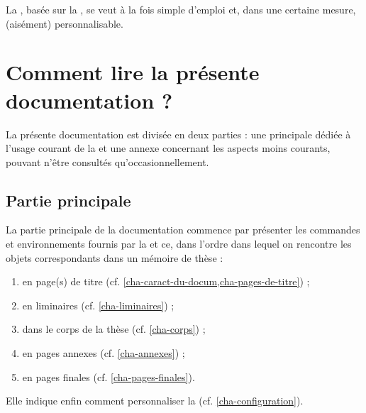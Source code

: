 La \yatCl{}, basée sur la , se veut à la fois simple d'emploi et,
dans une certaine mesure, (aisément) personnalisable.


\section{Comment lire la présente documentation ?}
\label{sec-comment-lire-cette}

La présente documentation est divisée en deux parties : une principale dédiée
à l'usage courant de la \yatCl{} et une annexe concernant les aspects moins
courants, pouvant n'être consultés qu'occasionnellement.

\subsection{Partie principale}
\label{sec-partie-principale}

La partie principale de la documentation commence par présenter les commandes et
environnements fournis par la \yatCl{} et ce, dans l'ordre dans lequel on
rencontre les objets correspondants dans un mémoire de thèse :
\begin{enumerate}
\item en page(s) de titre (cf. \vref{cha-caract-du-docum,cha-pages-de-titre}) ;
\item en \glspl{liminaire} (cf. \vref{cha-liminaires}) ;
\item dans le corps de la thèse (cf. \vref{cha-corps}) ;
\item en pages annexes (cf. \vref{cha-annexes}) ;
\item en pages finales (cf. \vref{cha-pages-finales}).
\end{enumerate}
Elle indique enfin comment personnaliser la \yatCl{}
(cf. \vref{cha-configuration}).

